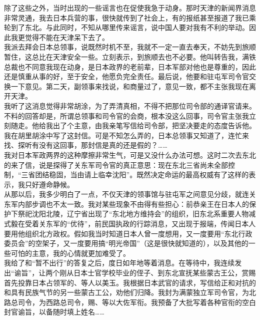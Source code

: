 除了这些之外，当时出现的一些谣言也在促使我急于动身。那时天津的新闻界消息非常灵通，我去日本兵营的事，很快就传到了社会上，有的报纸甚至报道了我已乘轮到了东北。与此同时，不知从哪里传来谣言，说中国人要对我有不利的举动。因此我更觉得不能在天津呆下去了。\\

我派去拜会日本总领事，说既然时机不至，我就不一定一直去奉天，不妨先到旅顺暂住，这总比在天津安全一些。立刻表示，到旅顺去也不必要。他叫转告我，满铁总裁也不同意我现在动身，是日本政界的老前辈，日本军部对他也是尊重的，因此还是慎重从事的好，至于安全，他愿负完全责任。最后说，他要和驻屯军司令官交换一下意见。第二天，副领事来找说，和商量过了，意见一致，都不主张我现在离开天津。\\

我听了这消息觉得非常胡涂，为了弄清真相，不得不把那位司令部的通译官请来。不料的回答却是，所谓总领事和司令官的会商，根本没这么回事，司令官主张我立刻随走。他给我出了个主意，由我亲笔写信给司令部，把坚决要走的态度告诉他。我在胡里胡涂中写了这封信。可是不知怎么弄的，日本总领事又知道了，连忙来找、探听有没有这回事，那封信是真的还是假的？……\\

我对日本军政两界的这种摩擦非常生气，可是又没什么办法可想。这时二次去东北的来了信，说是探得了关东军司令官的真正意思：现在东北三省尚未全部控制，“三省团结稳固，当由请上临幸沈阳”。既然决定命运的最高权威有了这样的表示，我只好遵命静候。\\

从那以后，我多少明白了一点，不仅天津的领事馆与驻屯军之间意见分歧，就连关东军内部步调也不太一致。我对某些现象不由得有些担心：前恭亲王在日本人的保护下祭祀沈阳北陵，辽宁省出现了“东北地方维持会”的组织，旧东北系重要人物减式毅在受着关东军的“优待”，前民国执政的行踪消息，又出现于报端，传闻日本人要用他组织北方政权。假如我当时知道日本人曾一度想用，又一度要用“东北行政委员会”的空架子，又一度要用搞“明光帝国”（这是很快就知道的），以及其他的一些可怕的主意，我的心情就更加难受了。\\

我给了和“暂不出行”的答复之后，度日如年地等着消息。在等待中，我连续发出“谕旨”，让两个刚从日本士官学校毕业的侄子、到东北宣抚某些蒙古王公，赏赐首先投靠日本占领军的、等人以美玉。我根据日本武官的请求，写信给正和对抗的和具有民族气节的另一些蒙古工公，劝他们归降。我封为满蒙独立军司令官，为北路总司令，为西路总司令，赐、等以大佐军衔。我预备了大批写着各种官衔的空白封官谕旨，以备随时填上姓名……\\

